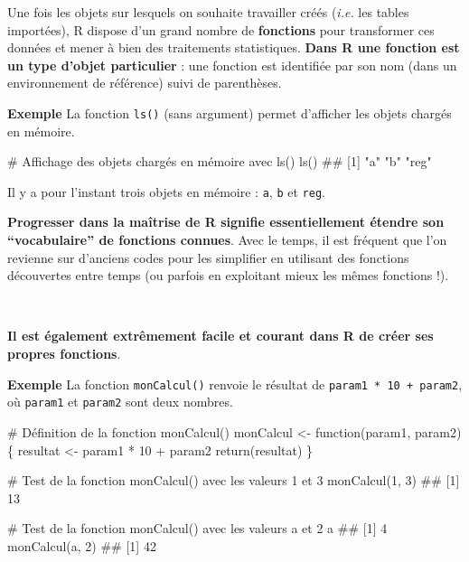 \documentclass[12pt,twosided, notitlepage]{book}
\newenvironment{Shaded}{}{}
\newcommand{\KeywordTok}[1]{\textcolor[rgb]{0.00,0.00,1.00}{#1}}
\newcommand{\DecValTok}[1]{#1}
\newcommand{\StringTok}[1]{\textcolor[rgb]{0.00,0.50,0.50}{#1}}
\newcommand{\CommentTok}[1]{\textcolor[rgb]{0.00,0.50,0.00}{#1}}
\newcommand{\ControlFlowTok}[1]{\textcolor[rgb]{0.00,0.00,1.00}{#1}}
\newcommand{\OperatorTok}[1]{#1}
\newcommand{\NormalTok}[1]{#1}
\renewenvironment{Shaded}{\begin{snugshade}}{\end{snugshade}}
\begin{document}
Une fois les objets sur lesquels on souhaite travailler créés
(\emph{i.e.} les tables importées), R dispose d'un grand nombre de
\textbf{fonctions} pour transformer ces données et mener à bien des
traitements statistiques. \textbf{Dans R une fonction est un type
d'objet particulier} : une fonction est identifiée par son nom (dans un
environnement de référence) suivi de parenthèses.

\textbf{Exemple} La fonction \texttt{ls()} (sans
argument) permet d'afficher les objets chargés en mémoire.

\begin{Shaded}
\begin{Highlighting}[]
\CommentTok{# Affichage des objets chargés en mémoire avec ls()}
\KeywordTok{ls}\NormalTok{()}
\NormalTok{  ## [1] "a"   "b"   "reg"}
\end{Highlighting}
\end{Shaded}

Il y a pour l'instant trois objets en mémoire : \texttt{a}, \texttt{b}
et \texttt{reg}.

\textbf{Progresser dans la maîtrise de R signifie essentiellement
étendre son \enquote{vocabulaire} de fonctions connues}. Avec le temps,
il est fréquent que l'on revienne sur d'anciens codes pour les
simplifier en utilisant des fonctions découvertes entre temps (ou
parfois en exploitant mieux les mêmes fonctions !).

~

\textbf{Il est également extrêmement facile et courant dans R de créer
ses propres fonctions}.

\textbf{Exemple} La fonction \texttt{monCalcul()} renvoie le résultat de
\texttt{param1\ *\ 10\ +\ param2}, où \texttt{param1} et \texttt{param2}
sont deux nombres.

\begin{Shaded}
\begin{Highlighting}[]
\CommentTok{# Définition de la fonction monCalcul()}
\NormalTok{monCalcul <-}\StringTok{ }\ControlFlowTok{function}\NormalTok{(param1, param2)\{}
\NormalTok{  resultat <-}\StringTok{ }\NormalTok{param1 }\OperatorTok{*}\StringTok{ }\DecValTok{10} \OperatorTok{+}\StringTok{ }\NormalTok{param2}
  \KeywordTok{return}\NormalTok{(resultat)}
\NormalTok{\}}

\CommentTok{# Test de la fonction monCalcul() avec les valeurs 1 et 3}
\KeywordTok{monCalcul}\NormalTok{(}\DecValTok{1}\NormalTok{, }\DecValTok{3}\NormalTok{)}
\NormalTok{  ## [1] 13}

\CommentTok{# Test de la fonction monCalcul() avec les valeurs a et 2}
\NormalTok{a}
\NormalTok{  ## [1] 4}
\KeywordTok{monCalcul}\NormalTok{(a, }\DecValTok{2}\NormalTok{)}
\NormalTok{  ## [1] 42}
\end{Highlighting}
\end{Shaded}
\end{document}
